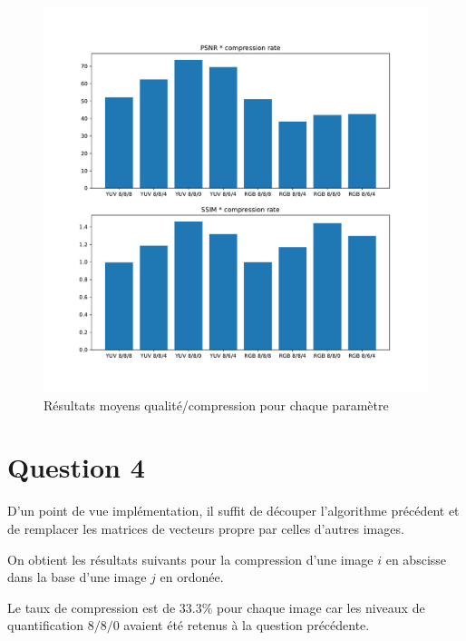 \documentclass{article}[letterpaper, 11pt]
\begin{document}
\begin{figure}[h]
    \centering
    \includegraphics[scale=0.45]{averages.pdf}
    \caption{Résultats moyens qualité/compression pour chaque paramètre}
\end{figure}

\newpage
\section{Question 4}
D'un point de vue implémentation, il suffit de découper l'algorithme précédent et de remplacer les matrices de vecteurs propre par celles d'autres images.

On obtient les résultats suivants pour la compression d'une image $i$ en abscisse dans la base d'une image $j$ en ordonée.

Le taux de compression est de $33.3\%$ pour chaque image car les niveaux de quantification $8/8/0$ avaient été retenus à la question précédente.
\end{document}
